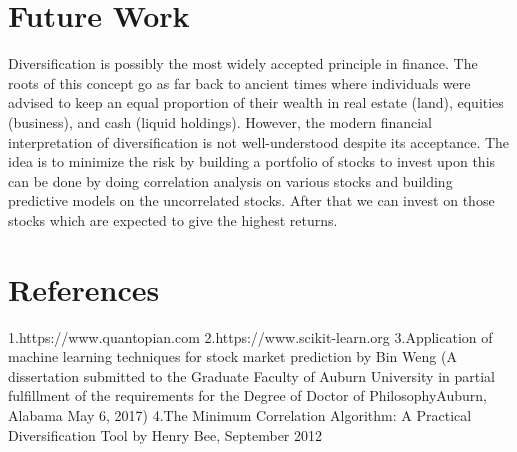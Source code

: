 \documentclass{report}
\begin{document}
\chapter{Future Work}
Diversification is possibly the most widely accepted principle in finance. The roots of this concept go as far
back to ancient times where individuals were advised to keep an equal proportion of their wealth in real estate
(land), equities (business), and cash (liquid holdings). However, the modern financial interpretation of
diversification is not well-understood despite its acceptance.
\newline \newline
The idea is to minimize the risk by building a portfolio of stocks to invest upon this can be done by doing correlation
analysis on various stocks and building predictive models on the uncorrelated stocks. After that we can invest on those stocks which are expected to give the highest returns. 

\newpage
\chapter{References}
	1.https://www.quantopian.com \newline \newline
	2.https://www.scikit-learn.org \newline\newline
	3.Application of machine learning techniques for stock market prediction by Bin Weng (A dissertation submitted to the Graduate Faculty of Auburn University in partial fulfillment of the requirements for the Degree of Doctor of PhilosophyAuburn, Alabama May 6, 2017)\newline\newline
	4.The Minimum Correlation Algorithm: A Practical Diversification Tool by Henry Bee, September 2012
\end{document}
